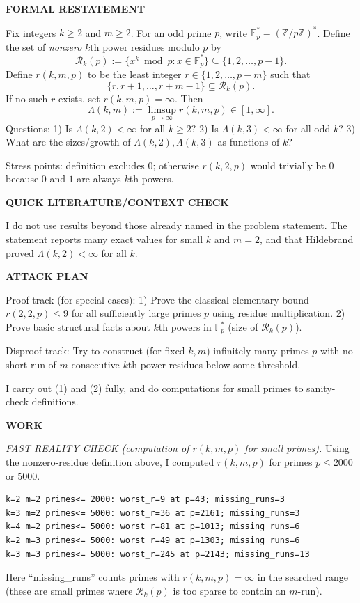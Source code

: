 \medskip
\noindent\textbf{FORMAL RESTATEMENT}

Fix integers $k\ge 2$ and $m\ge 2$. For an odd prime $p$, write $\mathbb F_p^*=(\mathbb Z/p\mathbb Z)^*$.
Define the set of \emph{nonzero} $k$th power residues modulo $p$ by
\[
\mathcal R_k(p):=\{x^k\bmod p : x\in\mathbb F_p^*\}\subseteq\{1,2,\dots,p-1\}.
\]
Define $r(k,m,p)$ to be the least integer $r\in\{1,2,\dots,p-m\}$ such that
\[
\{r,r+1,\dots,r+m-1\}\subseteq \mathcal R_k(p).
\]
If no such $r$ exists, set $r(k,m,p)=\infty$. Then
\[
\Lambda(k,m):=\limsup_{p\to\infty} r(k,m,p)\in[1,\infty].
\]
Questions:
1) Is $\Lambda(k,2)<\infty$ for all $k\ge 2$?
2) Is $\Lambda(k,3)<\infty$ for all odd $k$?
3) What are the sizes/growth of $\Lambda(k,2),\Lambda(k,3)$ as functions of $k$?

Stress points: definition excludes $0$; otherwise $r(k,2,p)$ would trivially be $0$ because $0$ and $1$ are always $k$th powers.

\medskip
\noindent\textbf{QUICK LITERATURE/CONTEXT CHECK}

I do not use results beyond those already named in the problem statement. The statement reports many exact values for small $k$ and $m=2$, and that Hildebrand proved $\Lambda(k,2)<\infty$ for all $k$.

\medskip
\noindent\textbf{ATTACK PLAN}

Proof track (for special cases):
1) Prove the classical elementary bound $r(2,2,p)\le 9$ for all sufficiently large primes $p$ using residue multiplication.
2) Prove basic structural facts about $k$th powers in $\mathbb F_p^*$ (size of $\mathcal R_k(p)$).

Disproof track:
Try to construct (for fixed $k,m$) infinitely many primes $p$ with no short run of $m$ consecutive $k$th power residues below some threshold.

I carry out (1) and (2) fully, and do computations for small primes to sanity-check definitions.

\medskip
\noindent\textbf{WORK}

\noindent\emph{FAST REALITY CHECK (computation of $r(k,m,p)$ for small primes).}
Using the nonzero-residue definition above, I computed $r(k,m,p)$ for primes $p\le 2000$ or $5000$.
\begin{verbatim}
k=2 m=2 primes<= 2000: worst_r=9 at p=43; missing_runs=3
k=3 m=2 primes<= 5000: worst_r=36 at p=2161; missing_runs=3
k=4 m=2 primes<= 5000: worst_r=81 at p=1013; missing_runs=6
k=2 m=3 primes<= 5000: worst_r=49 at p=1303; missing_runs=6
k=3 m=3 primes<= 5000: worst_r=245 at p=2143; missing_runs=13
\end{verbatim}
Here ``missing_runs'' counts primes with $r(k,m,p)=\infty$ in the searched range (these are small primes where $\mathcal R_k(p)$ is too sparse to contain an $m$-run).


